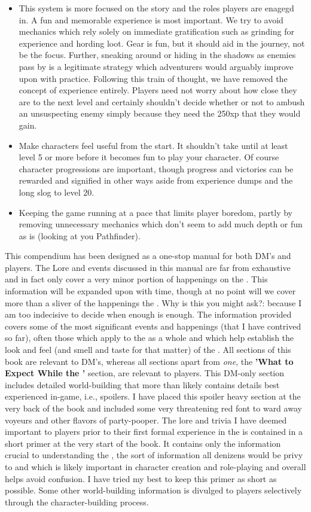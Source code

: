 \documentclass[twoside, 12pt, letterpaper]{report}\usepackage[]{graphicx}\usepackage[]{color}
\begin{document}
\begin{multicols*}{2}
\begin{itemize}
\item This system is more focused on the story and the roles players are enagegd in. A fun and memorable experience is most important. We try to avoid mechanics which rely solely on immediate gratification such as grinding for experience and hording loot. Gear is fun, but it should aid in the journey, not be the focus. Further, sneaking around or hiding in the shadows as enemies pass by is a legitimate strategy which adventurers would arguably improve upon with practice. Following this train of thought, we have removed the concept of experience entirely. Players need not worry about how close they are to the next level and certainly shouldn't decide whether or not to ambush an unsuspecting enemy simply because they need the 250xp that they would gain.
\item Make characters feel useful from the start. It shouldn't take until at least level 5 or more before it becomes fun to play your character. Of course character progressions are important, though progress and victories can be rewarded and signified in other ways aside from experience dumps and the long slog to level 20. 
\item Keeping the game running at a pace that limits player boredom, partly by removing unnecessary mechanics which don't seem to add much depth or fun as is (looking at you Pathfinder).
\end{itemize}
This compendium has been designed as a one-stop manual for both DM's and players. The Lore and events discussed in this manual are far from exhaustive and in fact only cover a very minor portion of happenings on the \mw. This information will be expanded upon with time, though at no point will we cover more than a sliver of the happenings \ooi the \mw. Why is this you might ask?: because I am too indecisive to decide when enough is enough. The information provided covers some of the most significant events and happenings (that I have contrived so far), often those which apply to the \mw as a whole and which help establish the look and feel (and smell and taste for that matter) of the \mw. All sections of this book are relevant to DM's, whereas all sections apart from \textit{one}, the \textbf{'What to Expect While \ooi the \mw'} section, are relevant to players. This DM-only section includes detailed world-building that more than likely contains details best experienced in-game, i.e., spoilers. I have placed this spoiler heavy section at the very back of the book and included some very threatening red font to ward away voyeurs and other flavors of party-pooper. The lore and trivia I have deemed important to players prior to their first formal experience in the \mw is contained in a short primer at the very start of the book. It contains only the information crucial to understanding the \mw, the sort of information all denizens would be privy to and which is likely important in character creation and role-playing and overall helps avoid confusion. I have tried my best to keep this primer as short as possible. Some other world-building information is divulged to players selectively through the character-building process.  



\end{multicols*}
\end{document}

